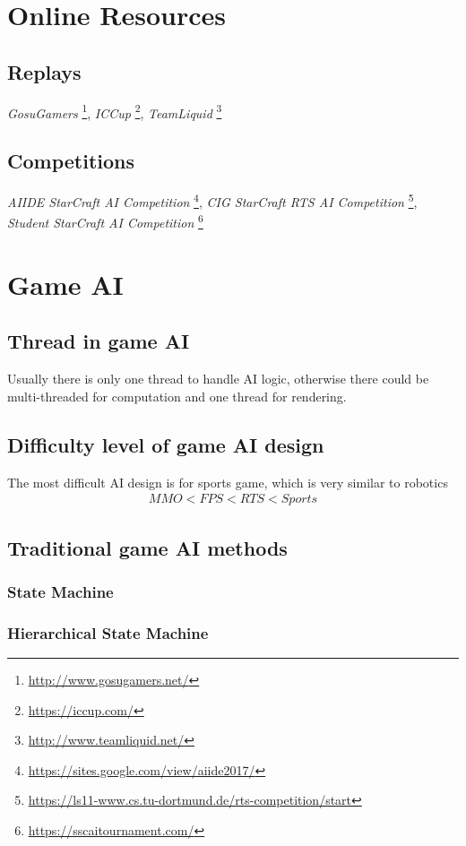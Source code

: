 \documentclass{llncs}
\begin{document}
\section{Online Resources}
\subsection{Replays}
\emph{GosuGamers}
\footnote{\url{http://www.gosugamers.net/}},
\emph{ICCup}
\footnote{\url{https://iccup.com/}},
\emph{TeamLiquid}
\footnote{\url{http://www.teamliquid.net/}}
\subsection{Competitions}
\emph{AIIDE StarCraft AI Competition}
\footnote{\url{https://sites.google.com/view/aiide2017/}},
\emph{CIG StarCraft RTS AI Competition}
\footnote{\url{https://ls11-www.cs.tu-dortmund.de/rts-competition/start}},
\emph{Student StarCraft AI Competition}
\footnote{\url{https://sscaitournament.com/}}

\section{Game AI}
\subsection{Thread in game AI}
Usually there is only one thread to handle AI logic, otherwise there could be multi-threaded for computation and one thread for rendering.
\subsection{Difficulty level of game AI design}
The most difficult AI design is for sports game, which is very similar to robotics
\begin{eqnarray}
MMO<FPS<RTS<Sports
\end{eqnarray}

\subsection{Traditional game AI methods}
\subsubsection{State Machine}
\subsubsection{Hierarchical State Machine}
\end{document}
